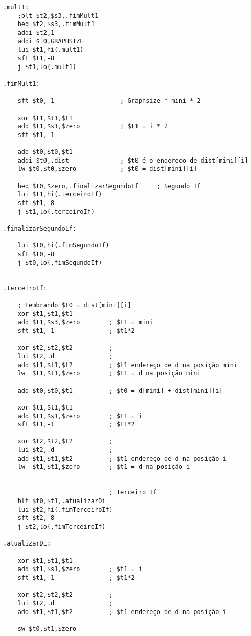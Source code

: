 \begin{verbatim}
.mult1:
    ;blt $t2,$s3,.fimMult1
    beq $t2,$s3,.fimMult1
    addi $t2,1 
    addi $t0,GRAPHSIZE
    lui $t1,hi(.mult1)
    sft $t1,-8 
    j $t1,lo(.mult1)

.fimMult1:

    sft $t0,-1                  ; Graphsize * mini * 2

    xor $t1,$t1,$t1
    add $t1,$s1,$zero           ; $t1 = i * 2
    sft $t1,-1
    
    add $t0,$t0,$t1  
    addi $t0,.dist              ; $t0 é o endereço de dist[mini][i] 
    lw $t0,$t0,$zero            ; $t0 = dist[mini][i]

    beq $t0,$zero,.finalizarSegundoIf     ; Segundo If
    lui $t1,hi(.terceiroIf)
    sft $t1,-8        
    j $t1,lo(.terceiroIf)

.finalizarSegundoIf:

    lui $t0,hi(.fimSegundoIf)
    sft $t0,-8
    j $t0,lo(.fimSegundoIf)
   
    
.terceiroIf:                 
    
    ; Lembrando $t0 = dist[mini][i] 
    xor $t1,$t1,$t1
    add $t1,$s3,$zero        ; $t1 = mini           
    sft $t1,-1               ; $t1*2  
    
    xor $t2,$t2,$t2          ;
    lui $t2,.d               ; 
    add $t1,$t1,$t2          ; $t1 endereço de d na posição mini
    lw  $t1,$t1,$zero        ; $t1 = d na posição mini
     
    add $t0,$t0,$t1          ; $t0 = d[mini] + dist[mini][i]   
    
    xor $t1,$t1,$t1
    add $t1,$s1,$zero        ; $t1 = i           
    sft $t1,-1               ; $t1*2  
    
    xor $t2,$t2,$t2          ;
    lui $t2,.d               ; 
    add $t1,$t1,$t2          ; $t1 endereço de d na posição i
    lw  $t1,$t1,$zero        ; $t1 = d na posição i
        

                             ; Terceiro If
    blt $t0,$t1,.atualizarDi        
    lui $t2,hi(.fimTerceiroIf)
    sft $t2,-8
    j $t2,lo(.fimTerceiroIf)
   
.atualizarDi:

    xor $t1,$t1,$t1
    add $t1,$s1,$zero        ; $t1 = i           
    sft $t1,-1               ; $t1*2  
    
    xor $t2,$t2,$t2          ;
    lui $t2,.d               ; 
    add $t1,$t1,$t2          ; $t1 endereço de d na posição i

    sw $t0,$t1,$zero


\end{verbatim}
